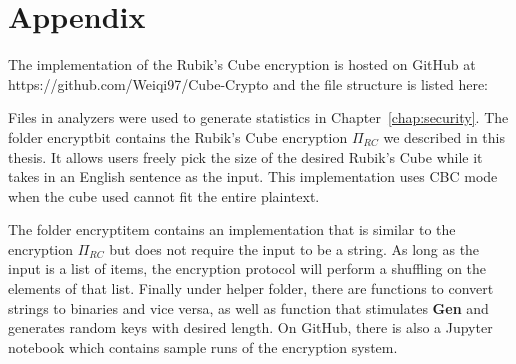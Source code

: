 \chapter{Appendix}
\par The implementation of the Rubik's Cube encryption is hosted on GitHub at https://github.com/Weiqi97/Cube-Crypto and the file structure is listed here:
\begin{center}
    \begin{minipage}{7cm}
    \end{minipage}
\end{center}
Files in analyzers were used to generate statistics in Chapter~\ref{chap:security}. The folder encrypt\textunderscore{}bit contains the Rubik's Cube encryption $\Pi_{RC}$ we described in this thesis. It allows users freely pick the size of the desired Rubik's Cube while it takes in an English sentence as the input. This implementation uses CBC mode when the cube used cannot fit the entire plaintext.
\par The folder encrypt\textunderscore{}item contains an implementation that is similar to the encryption $\Pi_{RC}$ but does not require the input to be a string. As long as the input is a list of items, the encryption protocol will perform a shuffling on the elements of that list. Finally under helper folder, there are functions to convert strings to binaries and vice versa, as well as function that stimulates \textbf{Gen} and generates random keys with desired length. On GitHub, there is also a Jupyter notebook which contains sample runs of the encryption system.